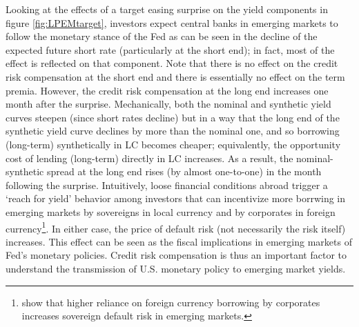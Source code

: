 {Looking at the effects of a target easing surprise on the yield components in figure \ref{fig:LPEMtarget}, investors expect central banks in emerging markets to follow the monetary stance of the Fed %
as can be seen in the decline of the expected future short rate (particularly at the short end); in fact, most of the effect is reflected on that component.
Note that there is no effect on the credit risk compensation at the short end and there is essentially no effect on the term premia. 
However, the credit risk compensation at the long end increases one month after the surprise.
Mechanically, both the nominal and synthetic yield curves steepen (since short rates decline) 
but in a way that the long end of the synthetic yield curve declines by more than the nominal one, 
and so borrowing (long-term) synthetically in LC becomes cheaper; equivalently, the opportunity cost of lending (long-term) directly in LC increases.
As a result, the nominal-synthetic spread at the long end rises (by almost one-to-one) in the month following the surprise.
Intuitively, loose financial conditions abroad trigger a `reach for yield' behavior among investors \citep{HausmanWongswan:2011} that can incentivize more borrwing in emerging markets by sovereigns in local currency \citep{BigioNunoPassadore:2018} and by corporates in foreign currency\footnote{\cite{DuSchreger:2017WP} show that higher reliance on foreign currency borrowing by corporates increases sovereign default risk in emerging markets.}.
In either case, the price of default risk (not necessarily the risk itself) increases. 
This effect can be seen as the fiscal implications in emerging markets of Fed's monetary policies. %
Credit risk compensation is thus an important factor to understand the transmission of U.S. monetary policy to emerging market yields.

}
